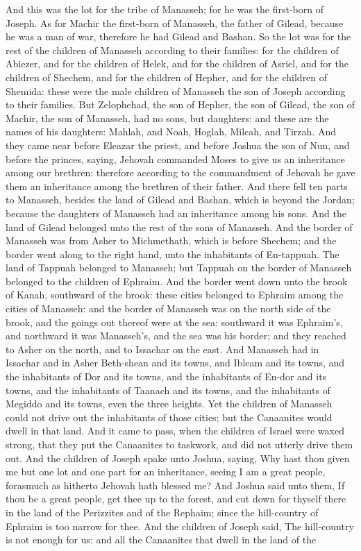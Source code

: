 And this was the lot for the tribe of Manasseh; for he was the first-born of Joseph. As for Machir the first-born of Manasseh, the father of Gilead, because he was a man of war, therefore he had Gilead and Bashan. So the lot was for the rest of the children of Manasseh according to their families: for the children of Abiezer, and for the children of Helek, and for the children of Asriel, and for the children of Shechem, and for the children of Hepher, and for the children of Shemida: these were the male children of Manasseh the son of Joseph according to their families. But Zelophehad, the son of Hepher, the son of Gilead, the son of Machir, the son of Manasseh, had no sons, but daughters: and these are the names of his daughters: Mahlah, and Noah, Hoglah, Milcah, and Tirzah. And they came near before Eleazar the priest, and before Joshua the son of Nun, and before the princes, saying, Jehovah commanded Moses to give us an inheritance among our brethren: therefore according to the commandment of Jehovah he gave them an inheritance among the brethren of their father. And there fell ten parts to Manasseh, besides the land of Gilead and Bashan, which is beyond the Jordan; because the daughters of Manasseh had an inheritance among his sons. And the land of Gilead belonged unto the rest of the sons of Manasseh.  And the border of Manasseh was from Asher to Michmethath, which is before Shechem; and the border went along to the right hand, unto the inhabitants of En-tappuah. The land of Tappuah belonged to Manasseh; but Tappuah on the border of Manasseh belonged to the children of Ephraim. And the border went down unto the brook of Kanah, southward of the brook: these cities belonged to Ephraim among the cities of Manasseh: and the border of Manasseh was on the north side of the brook, and the goings out thereof were at the sea: southward it was Ephraim’s, and northward it was Manasseh’s, and the sea was his border; and they reached to Asher on the north, and to Issachar on the east. And Manasseh had in Issachar and in Asher Beth-shean and its towns, and Ibleam and its towns, and the inhabitants of Dor and its towns, and the inhabitants of En-dor and its towns, and the inhabitants of Taanach and its towns, and the inhabitants of Megiddo and its towns, even the three heights. Yet the children of Manasseh could not drive out the inhabitants of those cities; but the Canaanites would dwell in that land. And it came to pass, when the children of Israel were waxed strong, that they put the Canaanites to taskwork, and did not utterly drive them out.  And the children of Joseph spake unto Joshua, saying, Why hast thou given me but one lot and one part for an inheritance, seeing I am a great people, forasmuch as hitherto Jehovah hath blessed me? And Joshua said unto them, If thou be a great people, get thee up to the forest, and cut down for thyself there in the land of the Perizzites and of the Rephaim; since the hill-country of Ephraim is too narrow for thee. And the children of Joseph said, The hill-country is not enough for us: and all the Canaanites that dwell in the land of the 